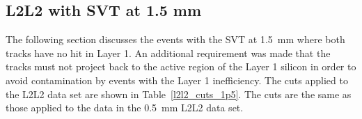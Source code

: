 \subsection{L2L2 with SVT at 1.5 mm}
The following section discusses the events with the SVT at 1.5~mm where both tracks have no hit in Layer 1. An additional requirement was made that the tracks must not project back to the active region of the Layer 1 silicon in order to avoid contamination by events with the Layer 1 inefficiency. The cuts applied to the L2L2 data set are shown in Table~\ref{l2l2_cuts_1p5}. The cuts are the same as those applied to the data in the 0.5~mm L2L2 data set. 
